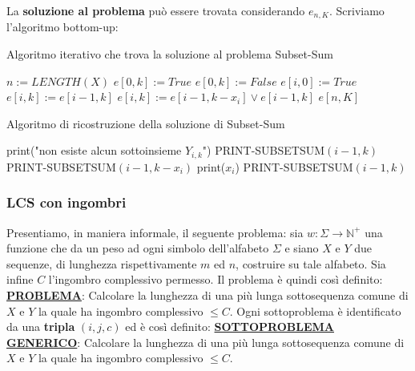 \documentclass[12pt]{article}
\begin{document}
La \textbf{soluzione al problema} può essere trovata considerando $e_{n,K}$. Scriviamo l'algoritmo bottom-up: \newline
\begin{algorithm}[H]
    \caption{Algoritmo iterativo che trova la soluzione al problema Subset-Sum}
    \DontPrintSemicolon
     {
        $n := LENGTH(X)$ \;
         {
             {
                $e[0,k] := True$
            } {
                $e[0,k] := False$
            }
        }
         {
            $e[i, 0] := True$
        }
         {
             {
                 {
                    $e[i,k] := e[i-1, k]$
                } {
                    $e[i,k] := e[i-1, k-x_i] \vee e[i-1,k]$
                }
            }
        }
        \Return $e[n, K]$
    }
\end{algorithm}
\begin{algorithm}[H]
    \caption{Algoritmo di ricostruzione della soluzione di Subset-Sum}
    \DontPrintSemicolon
     {
         {
            print("non esiste alcun sottoinsieme $Y_{i,k}$")
        } {
             {
                 {
                    PRINT-SUBSETSUM$(i-1, k)$
                } {
                     {
                        PRINT-SUBSETSUM$(i-1, k-x_i)$ \;
                        print($x_i$)
                    } {
                        PRINT-SUBSETSUM$(i-1, k)$
                    }
                }
            }
        }
    }
\end{algorithm}
\subsubsection{LCS con ingombri}
Presentiamo, in maniera informale, il seguente problema: sia $w: \Sigma \rightarrow \mathbb{N}^+$ una funzione che da un peso 
ad ogni simbolo dell'alfabeto $\Sigma$ e siano $X$ e $Y$ due sequenze, di lunghezza rispettivamente $m$ ed $n$, costruire su tale alfabeto. 
Sia infine $C$ l'ingombro complessivo permesso. 
Il problema è quindi così definito: \newline
\textbf{\underline{PROBLEMA}}: Calcolare la lunghezza di una più lunga sottosequenza comune di $X$ e $Y$ la quale ha ingombro complessivo $\leq C$. \newline
Ogni sottoproblema è identificato da una \textbf{tripla} $(i, j, c)$ ed è così definito: \newline
\textbf{\underline{SOTTOPROBLEMA GENERICO}}: Calcolare la lunghezza di una più lunga sottosequenza comune di $X$ e $Y$ la quale ha ingombro complessivo $\leq C$. \newline
\end{document}
